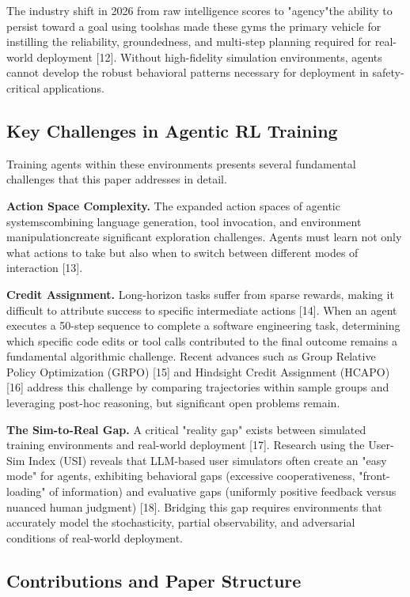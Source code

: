 The industry shift in 2026 from raw intelligence scores to "agency"the ability to persist toward a goal using toolshas made these gyms the primary vehicle for instilling the reliability, groundedness, and multi-step planning required for real-world deployment [12]. Without high-fidelity simulation environments, agents cannot develop the robust behavioral patterns necessary for deployment in safety-critical applications.

\subsection{Key Challenges in Agentic RL Training}

Training agents within these environments presents several fundamental challenges that this paper addresses in detail.

\textbf{Action Space Complexity.} The expanded action spaces of agentic systemscombining language generation, tool invocation, and environment manipulationcreate significant exploration challenges. Agents must learn not only what actions to take but also when to switch between different modes of interaction [13].

\textbf{Credit Assignment.} Long-horizon tasks suffer from sparse rewards, making it difficult to attribute success to specific intermediate actions [14]. When an agent executes a 50-step sequence to complete a software engineering task, determining which specific code edits or tool calls contributed to the final outcome remains a fundamental algorithmic challenge. Recent advances such as Group Relative Policy Optimization (GRPO) [15] and Hindsight Credit Assignment (HCAPO) [16] address this challenge by comparing trajectories within sample groups and leveraging post-hoc reasoning, but significant open problems remain.

\textbf{The Sim-to-Real Gap.} A critical "reality gap" exists between simulated training environments and real-world deployment [17]. Research using the User-Sim Index (USI) reveals that LLM-based user simulators often create an "easy mode" for agents, exhibiting behavioral gaps (excessive cooperativeness, "front-loading" of information) and evaluative gaps (uniformly positive feedback versus nuanced human judgment) [18]. Bridging this gap requires environments that accurately model the stochasticity, partial observability, and adversarial conditions of real-world deployment.

\subsection{Contributions and Paper Structure}

